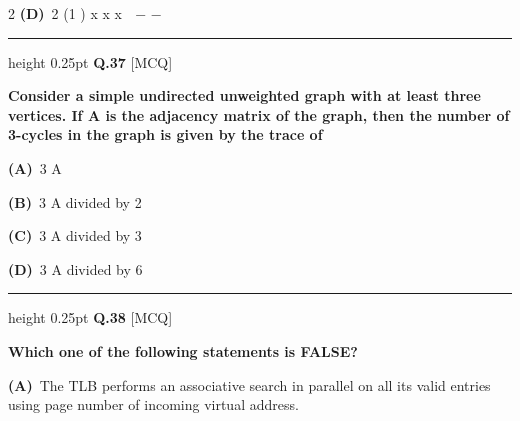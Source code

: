 \documentclass[a4paper,10pt,twoside]{article}
\begin{document}
\begin{multicols}{2}
\textbf{(D)}~2   \newline (1 \newline )  \newline x \newline x \newline x \newline  \newline − \newline −
\par\vspace{6pt}\hrule height 0.25pt\vspace{6pt}
\noindent\textbf{Q.37} \hfill {\footnotesize\textsf{[MCQ]}}
\par\vspace{2pt}
{\bfseries Consider a simple undirected unweighted graph with at least three vertices. If A is
the adjacency matrix of the graph, then the number of 3-cycles in the graph is given
by the trace of \par}
\par\vspace{2pt}\noindent
\textbf{(A)}~3 \newline A\par\vspace{2pt}\noindent
\textbf{(B)}~3 \newline A divided by 2\par\vspace{2pt}\noindent
\textbf{(C)}~3 \newline A divided by 3\par\vspace{2pt}\noindent
\textbf{(D)}~3 \newline A divided by 6
\par\vspace{6pt}\hrule height 0.25pt\vspace{6pt}
\noindent\textbf{Q.38} \hfill {\footnotesize\textsf{[MCQ]}}
\par\vspace{2pt}
{\bfseries Which one of the following statements is FALSE? \par}
\par\vspace{2pt}\noindent
\textbf{(A)}~The TLB performs an associative search in parallel on all its valid entries using page \newline number of incoming virtual address.\par\vspace{2pt}\noindent

\end{multicols}
\end{document}
